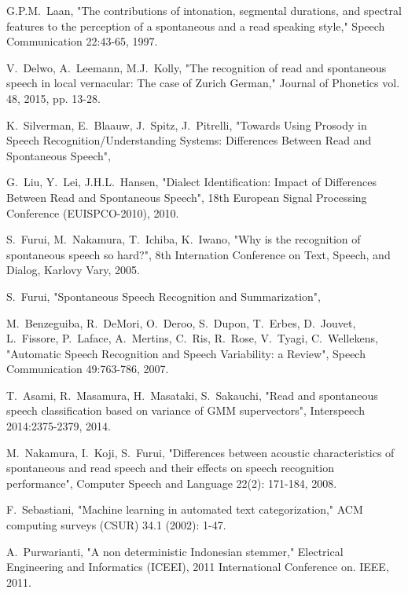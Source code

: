 \documentclass[conference]{IEEEtran}
\begin{document}
\begin{thebibliography}{1}

G.P.M.~Laan,
    "The contributions of intonation, segmental durations, and spectral features to the perception of a spontaneous and a read speaking style,"
    Speech Communication 22:43-65, 1997.

V.~Delwo, A.~Leemann, M.J.~Kolly,
    "The recognition of read and spontaneous speech in local vernacular: The case of Zurich German,"
    Journal of Phonetics vol. 48, 2015, pp. 13-28.

K.~Silverman, E.~Blaauw, J.~Spitz, J.~Pitrelli,
    "Towards Using Prosody in Speech Recognition/Understanding Systems: Differences Between Read and Spontaneous Speech",

G.~Liu, Y.~Lei, J.H.L.~Hansen,
    "Dialect Identification: Impact of Differences Between Read and Spontaneous Speech",
    18th European Signal Processing Conference (EUISPCO-2010), 2010.

S.~Furui, M.~Nakamura, T.~Ichiba, K.~Iwano,
	"Why is the recognition of spontaneous speech so hard?",
	8th Internation Conference on Text, Speech, and Dialog,
	Karlovy Vary, 2005.

S.~Furui,
    "Spontaneous Speech Recognition and Summarization",

M.~Benzeguiba, R.~DeMori, O.~Deroo, S.~Dupon, T.~Erbes, D.~Jouvet, L.~Fissore, P.~Laface, A.~Mertins, C.~Ris, R.~Rose, V.~Tyagi, C.~Wellekens,
	"Automatic Speech Recognition and Speech Variability: a Review",
	Speech Communication 49:763-786, 2007.

T.~Asami, R.~Masamura, H.~Masataki, S.~Sakauchi,
    "Read and spontaneous speech classification based on variance of GMM supervectors",
	Interspeech 2014:2375-2379, 2014.

M.~Nakamura, I.~Koji, S.~Furui,
    "Differences between acoustic characteristics of spontaneous and read speech and their effects on speech recognition performance",
    Computer Speech and Language 22(2): 171-184, 2008.

F.~Sebastiani,
    "Machine learning in automated text categorization,"
    ACM computing surveys (CSUR) 34.1 (2002): 1-47.

A.~Purwarianti,
    "A non deterministic Indonesian stemmer,"
    Electrical Engineering and Informatics (ICEEI),
    2011 International Conference on. IEEE, 2011.


\end{thebibliography}
\end{document}
